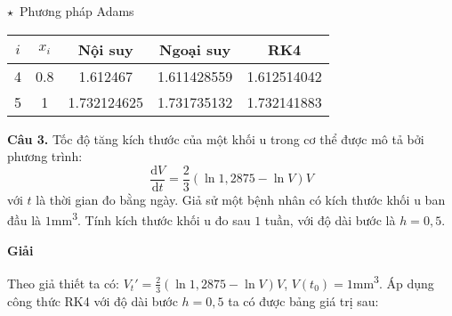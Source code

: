 $\star$~Phương pháp Adams
\begin{longtable}{|c|c|c|c|c|}\hline
	$i$ & $x_i$ & Nội suy     & Ngoại suy   & RK4         \\ \hline
	\endhead
	4   & 0.8   & 1.612467    & 1.611428559 & 1.612514042 \\ \hline
	5   & 1     & 1.732124625 & 1.731735132 & 1.732141883 \\ \hline
\end{longtable}

\textbf{Câu 3.} Tốc độ tăng kích thước của một khối u trong cơ thể được mô tả bởi phương trình:
$$\frac{\text{d}V}{\text{d}t}=\frac{2}{3}(\ln{1,2875}-\ln{V})V$$
với $t$ là thời gian đo bằng ngày. Giả sử một bệnh nhân có kích thước khối u ban đầu là $1$mm\textsuperscript{3}. Tính kích thước khối u đo sau $1$ tuần, với độ dài bước là $h=0,5$.\par
\textbf{Giải}\par
Theo giả thiết ta có: ${V_t}'= \frac{2}{3}(\ln{1,2875}-\ln{V})V$, $V(t_0)=1$mm\textsuperscript{3}. Áp dụng công thức RK4 với độ dài bước $h=0,5$ ta có được bảng giá trị sau:

